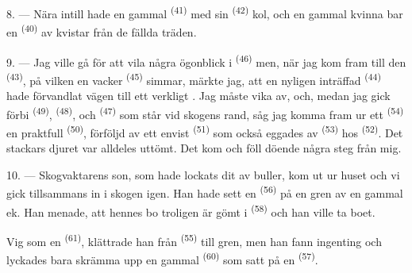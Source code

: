 8. --- Nära intill hade en gammal  \textsuperscript{(41)} med sin
 \textsuperscript{(42)} kol, och en gammal
kvinna bar en  \textsuperscript{(40)}  av kvistar
från de fällda träden.

\VUsaut{3.0mm}
\VUsaut{3.0mm}

9. --- Jag ville gå för att vila några ögonblick i 
\textsuperscript{(46)} men, när jag kom fram till den 
\textsuperscript{(43)}, på vilken en vacker  \textsuperscript{(45)}
simmar, märkte jag, att en nyligen inträffad 
\textsuperscript{(44)} hade förvandlat vägen till ett verkligt .
Jag måste vika av, och, medan jag gick förbi 
\textsuperscript{(49)},  \textsuperscript{(48)}, och
 \textsuperscript{(47)} som står vid skogens rand, såg jag komma
fram ur ett  \textsuperscript{(54)} en praktfull 
\textsuperscript{(50)}, förföljd av ett envist 
\textsuperscript{(51)} som också eggades av 
\textsuperscript{(53)} hos  \textsuperscript{(52)}. Det
stackars djuret var alldeles uttömt. Det kom och föll döende några steg från mig.

10. --- Skogvaktarens son, som hade lockats dit av  buller,
kom ut ur huset och vi gick tillsammans in i skogen igen. Han hade sett en
 \textsuperscript{(56)} på en gren av en gammal ek. Han menade, att
hennes bo troligen är gömt i  \textsuperscript{(58)} och han
ville ta boet.

Vig som en  \textsuperscript{(61)}, klättrade han från
 \textsuperscript{(55)} till gren, men han fann ingenting och lyckades
bara skrämma upp en gammal  \textsuperscript{(60)} som satt på en
 \textsuperscript{(57)}.
\VUsaut{4.0mm}
\VUfilet{22mm}
